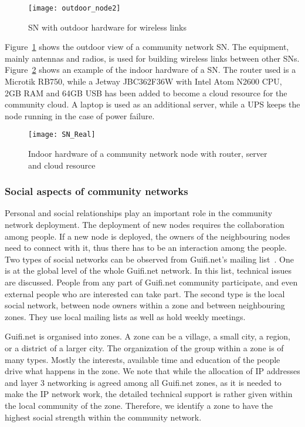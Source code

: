\begin{figure}[tbp]
   \centering
		\texttt{[image: outdoor\_node2]}
		\caption{SN with outdoor hardware for wireless links}
		\label{fig:outdoor_node}
\end{figure} 

Figure~\ref{fig:outdoor_node} shows the outdoor view of a community network SN. 
The equipment, mainly antennas and radios, is used for building wireless links between other SNs. 
Figure~\ref{fig:SN_Real} shows an example of the indoor hardware of a SN. 
The router used is a Microtik RB750, while a Jetway JBC362F36W with Intel Atom N2600 CPU, 2GB RAM and 64GB USB has been added to become a cloud resource for the community cloud.
A laptop is used as an additional server, while a UPS keeps the node running in the case of power failure.

\begin{figure}[tbp]
   \centering
		\texttt{[image: SN\_Real]}
		\caption{Indoor hardware of a community network node with router, server and cloud resource}
		\label{fig:SN_Real}
\end{figure} 


\subsubsection{Social aspects of community networks}

Personal and social relationships play an important role in the community network deployment. 
The deployment of new nodes requires the collaboration among people. 
If a new node is deployed, the owners of the neighbouring nodes need to connect with it, thus there has to be an interaction among the people. 
Two types of social networks can be observed from Guifi.net's mailing list~\cite{GuifinetForum}. 
One is at the global level of the whole Guifi.net network. 
In this list, technical issues are discussed. 
People from any part of Guifi.net community participate, and even external people who are interested can take part. 
The second type is the local social network, between node owners within a zone and between neighbouring zones. 
They use local mailing lists as well as hold weekly meetings.

Guifi.net is organised into zones. 
A zone can be a village, a small city, a region, or a district of a larger city. 
The organization of the group within a zone is of many types. 
Mostly the interests, available time and education of the people drive what happens in the zone. 
We note that while the allocation of IP addresses and layer 3 networking is agreed among all Guifi.net zones, as it is needed to make the IP network work, the detailed technical support is rather given within the local community of the zone. 
Therefore, we identify a zone to have the highest social strength within the community network.

